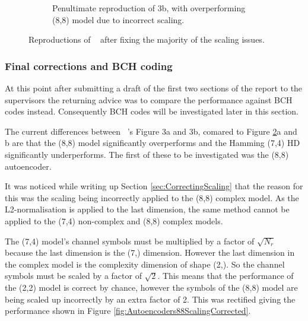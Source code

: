 \documentclass[12pt,onecolumn,letterpaper]{article}
\begin{document}
\begin{figure}[t!]
\begin{subfigure}[t]{0.45\textwidth}
       \caption{Penultimate reproduction of 3b, with overperforming (8,8) model due to incorrect scaling.}
       \label{fig:OSheaFigure3bIncorrect88}
   \end{subfigure}
   \caption{Reproductions of ~\cite{oShea} after fixing the majority of the scaling issues.}
   \label{fig:OSheaFig3Incorrect88}
\end{figure}

\subsubsection{Final corrections and BCH coding}

At this point after submitting a draft of the first two sections of the report to the supervisors the returning advice was to compare the performance against BCH codes instead. Consequently BCH codes will be investigated later in this section.

The current differences between ~\cite{oShea}'s Figure 3a and 3b, comared to Figure \ref{fig:OSheaFig3Incorrect88}a and b are that the (8,8) model significantly overperforms and the Hamming (7,4) HD significantly underperforms. The first of these to be investigated was the (8,8) autoencoder. 

It was noticed while writing up Section \ref{sec:CorrectingScaling} that the reason for this was the scaling being incorrectly applied to the (8,8) complex model. As the L2-normalisation is applied to the last dimension, the same method cannot be applied to the (7,4) non-complex and (8,8) complex models. 

The (7,4) model's channel symbols must be multiplied by a factor of $\sqrt{N_r}$ because the last dimension is the (7,) dimension. However the last dimension in the complex model is the complexity dimension of shape (2,). So the channel symbols must be scaled by a factor of $\sqrt{2}$. This means that the performance of the (2,2) model is correct by chance, however the symbols of the (8,8) model are being scaled up incorrectly by an extra factor of 2. This was rectified giving the performance shown in Figure \ref{fig:Autoencoders88ScalingCorrected}.
\end{document}
